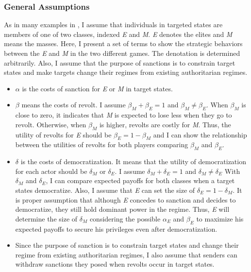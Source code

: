 \documentclass[11pt]{article}
\begin{document}
\subsubsection*{General Assumptions}
As in many examples in \citet{Acemoglu2006a}, I assume that individuals in targeted states are members of one of two classes, indexed \textit{E} and \textit{M}. \textit{E} denotes the elites and \textit{M} means the masses. Here, I present a set of terms to show the strategic behaviors between the \textit{E} and \textit{M} in the two different games. The denotation is determined arbitrarily. Also, I assume that the purpose of sanctions is to constrain target states and make targets change their regimes from existing authoritarian regimes.
	
\begin{itemize}
	\item $\alpha$ is the costs of sanction for \textit{E} or \textit{M} in target states. 
	\item $\beta$ means the costs of revolt. I assume $ \beta_{M} + \beta_{E} = 1$ and $\beta_{M} \neq \beta_{E}$. When $\beta_{M}$ is close to zero, it indicates that \textit{M} is expected to lose less when they go to revolt. Otherwise, when $\beta_{M}$ is higher, revolts are costly for \textit{M}. Thus, the utility of revolts for \textit{E} should be $\beta_{E} = 1-\beta_{M}$ and I can show the relationship between the utilities of revolts for both players comparing $\beta_{M}$ and $\beta_{E}$.
	\item $\delta$ is the costs of democratization. It means that the utility of democratization for each actor should be $\delta_{M}$ or $\delta_{E}$. I assume $\delta_{M} + \delta_{E} = 1$ and $\delta_{M} \neq \delta_{E}$ With $\delta_{M}$ and $\delta_{E}$, I can compare expected payoffs for both classes when a target states democratize. Also, I assume that \textit{E} can set the size of $\delta_{E} = 1-\delta_{M}$. It is proper assumption that although \textit{E} concedes to sanction and decides to democratize, they still hold dominant power in the regime. Thus, \textit{E} will determine the size of $\delta_{M}$ considering the possible $\alpha_{E}$ and $\beta_{E}$ to maximize his expected payoffs to secure his privileges even after democratization.
	\item Since the purpose of sanction is to constrain target states and change their regime from existing authoritarian regimes, I also assume that senders can withdraw sanctions they posed when revolts occur in target states.
\end{itemize}
	
\end{document}
